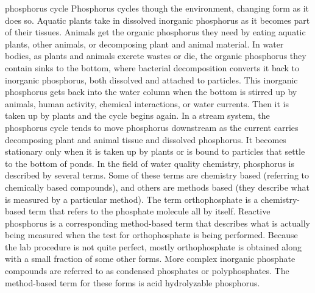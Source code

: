 \documentclass{article}
\begin{document}
phosphorus cycle Phosphorus cycles though the environment, changing form
as it does so. Aquatic plants take in dissolved inorganic phosphorus as
it becomes part of their tissues. Animals get the organic phosphorus
they need by eating aquatic plants, other animals, or decomposing plant
and animal material. In water bodies, as plants and animals excrete
wastes or die, the organic phosphorus they contain sinks to the bottom,
where bacterial decomposition converts it back to inorganic phosphorus,
both dissolved and attached to particles. This inorganic phosphorus gets
back into the water column when the bottom is stirred up by animals,
human activity, chemical interactions, or water currents. Then it is
taken up by plants and the cycle begins again. In a stream system, the
phosphorus cycle tends to move phosphorus downstream as the current
carries decomposing plant and animal tissue and dissolved phosphorus. It
becomes stationary only when it is taken up by plants or is bound to
particles that settle to the bottom of ponds. In the field of water
quality chemistry, phosphorus is described by several terms. Some of
these terms are chemistry based (referring to chemically based
compounds), and others are methods based (they describe what is measured
by a particular method). The term orthophosphate is a chemistry-based
term that refers to the phosphate molecule all by itself. Reactive
phosphorus is a corresponding method-based term that describes what is
actually being measured when the test for orthophosphate is being
performed. Because the lab procedure is not quite perfect, mostly
orthophosphate is obtained along with a small fraction of some other
forms. More complex inorganic phosphate compounds are referred to as
condensed phosphates or polyphosphates. The method-based term for these
forms is acid hydrolyzable phosphorus.
\end{document}
